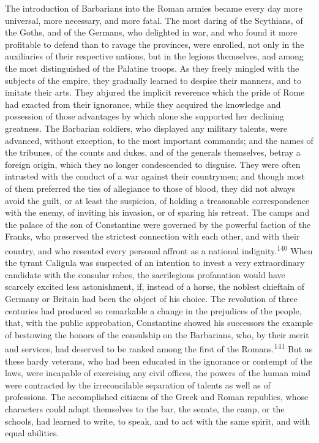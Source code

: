 The introduction of Barbarians into the Roman armies became every
day more universal, more necessary, and more fatal. The most
daring of the Scythians, of the Goths, and of the Germans, who
delighted in war, and who found it more profitable to defend than
to ravage the provinces, were enrolled, not only in the
auxiliaries of their respective nations, but in the legions
themselves, and among the most distinguished of the Palatine
troops. As they freely mingled with the subjects of the empire,
they gradually learned to despise their manners, and to imitate
their arts. They abjured the implicit reverence which the pride
of Rome had exacted from their ignorance, while they acquired the
knowledge and possession of those advantages by which alone she
supported her declining greatness. The Barbarian soldiers, who
displayed any military talents, were advanced, without exception,
to the most important commands; and the names of the tribunes, of
the counts and dukes, and of the generals themselves, betray a
foreign origin, which they no longer condescended to disguise.
They were often intrusted with the conduct of a war against their
countrymen; and though most of them preferred the ties of
allegiance to those of blood, they did not always avoid the
guilt, or at least the suspicion, of holding a treasonable
correspondence with the enemy, of inviting his invasion, or of
sparing his retreat. The camps and the palace of the son of
Constantine were governed by the powerful faction of the Franks,
who preserved the strictest connection with each other, and with
their country, and who resented every personal affront as a
national indignity.\textsuperscript{140} When the tyrant Caligula was suspected of
an intention to invest a very extraordinary candidate with the
consular robes, the sacrilegious profanation would have scarcely
excited less astonishment, if, instead of a horse, the noblest
chieftain of Germany or Britain had been the object of his
choice. The revolution of three centuries had produced so
remarkable a change in the prejudices of the people, that, with
the public approbation, Constantine showed his successors the
example of bestowing the honors of the consulship on the
Barbarians, who, by their merit and services, had deserved to be
ranked among the first of the Romans.\textsuperscript{141} But as these hardy
veterans, who had been educated in the ignorance or contempt of
the laws, were incapable of exercising any civil offices, the
powers of the human mind were contracted by the irreconcilable
separation of talents as well as of professions. The accomplished
citizens of the Greek and Roman republics, whose characters could
adapt themselves to the bar, the senate, the camp, or the
schools, had learned to write, to speak, and to act with the same
spirit, and with equal abilities.


